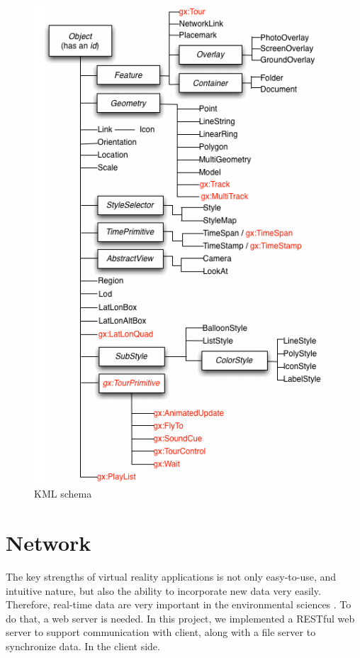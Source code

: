 \begin{figure}[H]
\caption[kml-schema]{KML schema \parencite{Google.kml.2016}}
\label{fig:kml-schema}
\centering
\includegraphics[height=0.5\textheight]{Figures/kml-schema.png}
\decoRule
\end{figure}

\section{Network}
\label{section:network}

The key strengths of virtual reality applications is not only easy-to-use, and intuitive nature, but also the ability to incorporate new data very easily. Therefore, real-time data are very important in the environmental sciences \parencite{blower.sharing-visualizing.2007}. To do that, a web server is needed. In this project, we implemented a RESTful web server to support communication with client, along with a  file server to synchronize data. In the client side.

